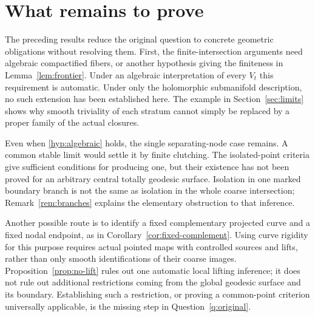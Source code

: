 \documentclass[11pt]{article}
\theoremstyle{definition}
\theoremstyle{remark}
\begin{document}
\section{What remains to prove}

The preceding results reduce the original question to concrete geometric obligations without resolving them. First, the finite-intersection arguments need algebraic compactified fibers, or another hypothesis giving the finiteness in Lemma~\ref{lem:frontier}. Under an algebraic interpretation of every $V_t$ this requirement is automatic. Under only the holomorphic submanifold description, no such extension has been established here. The example in Section~\ref{sec:limits} shows why smooth triviality of each stratum cannot simply be replaced by a proper family of the actual closures.

Even when \eqref{hyp:algebraic} holds, the single separating-node case remains. A common stable limit would settle it by finite clutching. The isolated-point criteria give sufficient conditions for producing one, but their existence has not been proved for an arbitrary central totally geodesic surface. Isolation in one marked boundary branch is not the same as isolation in the whole coarse intersection; Remark~\ref{rem:branches} explains the elementary obstruction to that inference.

Another possible route is to identify a fixed complementary projected curve and a fixed nodal endpoint, as in Corollary~\ref{cor:fixed-complement}. Using curve rigidity for this purpose requires actual pointed maps with controlled sources and lifts, rather than only smooth identifications of their coarse images. Proposition~\ref{prop:no-lift} rules out one automatic local lifting inference; it does not rule out additional restrictions coming from the global geodesic surface and its boundary. Establishing such a restriction, or proving a common-point criterion universally applicable, is the missing step in Question~\ref{q:original}.
\end{document}
